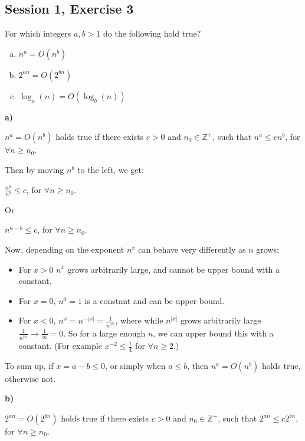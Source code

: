 \subsection{Session 1, Exercise 3}


For which integers $a,b > 1$ do the following hold true?

\begin{enumerate}[a.)]
\item $n^a = O(n^b)$
\item $2^{an} = O(2^{bn})$
\item $\log_a(n) = O(\log_b(n))$
\end{enumerate}


 \textbf{a)}

$n^a = O(n^b)$ holds true if there exists $c>0$ and $n_0\in{}\mathds{Z}^+$, such that $n^a \leq{} cn^b$, for $\forall{}n\geq{}n_0$.

Then by moving $n^b$ to the left, we get:

$\frac{n^a}{n^b} \leq{} c$, for $\forall{}n\geq{}n_0$.

Or

$n^{a-b}\leq{} c$, for $\forall{}n\geq{}n_0$.

Now, depending on the exponent $n^{x}$ can behave very differently as $n$ grows:

\begin{itemize}
    \item For $x > 0$ $n^{x}$ grows arbitrarily large, and cannot be upper bound with a constant.
    \item For $x=0$, $n^0 = 1$ is a constant and can be upper bound.
    \item For $x<0$, $n^{x} = n^{-|x|} = \frac{1}{n^{|x|}}$, where while $n^{|x|}$ grows arbitrarily large $\frac{1}{n^{|x|}} \rightarrow \frac{1}{\infty} = 0$. So for a large enough $n$, we can upper bound this with a constant. (For example $x^{-2} \leq{} \frac{1}{4}$ for $\forall{}n\geq{}2$.)
\end{itemize}

To sum up, if $x = a-b \leq{} 0$, or simply when $a\leq{}b$, then $n^a = O(n^b)$ holds true, otherwise not.

\textbf{b)}

$2^{an} = O(2^{bn})$ holds true if there exists $c>0$ and $n_0\in{}\mathds{Z}^+$, such that $2^{an} \leq{} c2^{bn}$, for $\forall{}n\geq{}n_0$.

